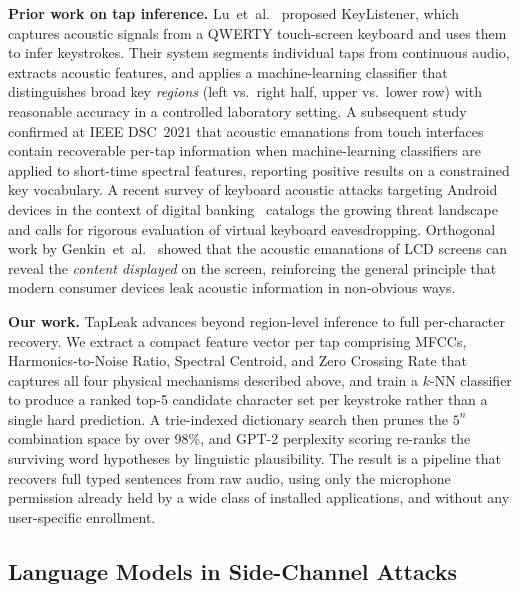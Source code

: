 \documentclass[conference]{IEEEtran}
\begin{document}
\textbf{Prior work on tap inference.}
Lu~et~al.~\cite{lu2019keylistener} proposed KeyListener, which
captures acoustic signals from a QWERTY touch-screen keyboard and
uses them to infer keystrokes.
Their system segments individual taps from continuous audio,
extracts acoustic features, and applies a machine-learning classifier
that distinguishes broad key \emph{regions} (left vs.\ right half,
upper vs.\ lower row) with reasonable accuracy in a controlled
laboratory setting.
A subsequent study~\cite{ieee2021touch} confirmed at IEEE DSC~2021
that acoustic emanations from touch interfaces contain recoverable
per-tap information when machine-learning classifiers are applied to
short-time spectral features, reporting positive results on a
constrained key vocabulary.
A recent survey of keyboard acoustic attacks targeting Android
devices in the context of digital banking~\cite{android2023}
catalogs the growing threat landscape and calls for rigorous
evaluation of virtual keyboard eavesdropping.
Orthogonal work by Genkin~et~al.~\cite{genkin2019synesthesia} showed
that the acoustic emanations of LCD screens can reveal the
\emph{content displayed} on the screen, reinforcing the general
principle that modern consumer devices leak acoustic information in
non-obvious ways.

\textbf{Our work.}
TapLeak advances beyond region-level inference to full per-character
recovery. We extract a compact feature vector per tap comprising
MFCCs, Harmonics-to-Noise Ratio, Spectral Centroid, and Zero
Crossing Rate that captures all four physical mechanisms described
above, and train a $k$-NN classifier to produce a ranked top-5
candidate character set per keystroke rather than a single hard
prediction. A trie-indexed dictionary search then prunes the $5^n$ combination space by over 98\%, and GPT-2 perplexity scoring
re-ranks the surviving word hypotheses by linguistic plausibility. The result is a pipeline that recovers full typed sentences from raw audio, using only the microphone permission already held by a wide class of installed applications, and without any user-specific enrollment.

\subsection{Language Models in Side-Channel Attacks}
\end{document}
